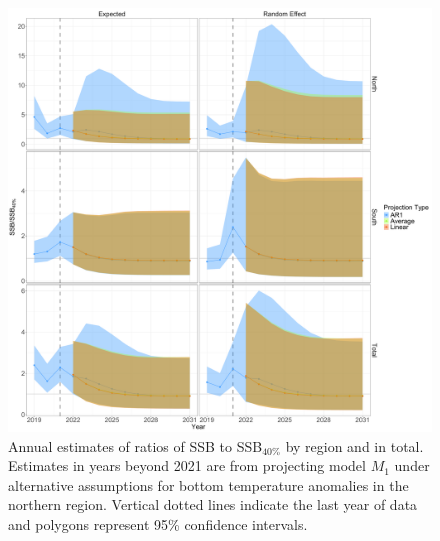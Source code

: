 \documentclass[
]{article}
\begin{document}
\begin{figure}

{\centering \includegraphics[height=0.95\textheight]{proj_SSB_status_results} 

}

\caption{Annual estimates of ratios of SSB to SSB$_{40\%}$ by region and in total. Estimates in years beyond 2021 are from projecting model $M_1$ under alternative assumptions for bottom temperature anomalies in the northern region. Vertical dotted lines indicate the last year of data and polygons represent 95\% confidence intervals.}\label{fig:SSB-status-proj}
\end{figure}
\end{document}
